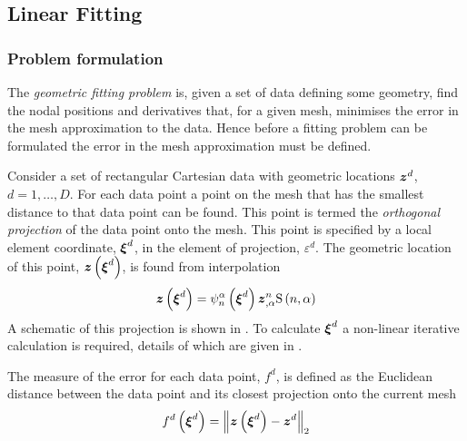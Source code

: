 \subsection{Linear Fitting}

\subsubsection{Problem formulation}

The \emph{geometric fitting problem} is, given a set of data defining some
geometry, find the nodal positions and derivatives that, for a given mesh,
minimises the error in the mesh approximation to the data. Hence before a
fitting problem can be formulated the error in the mesh approximation must be
defined.

Consider a set of rectangular Cartesian data with geometric locations
$\boldsymbol{z}^{d}$, $d=1,\ldots,D$. For each data point a point on the mesh
that has the smallest distance to that data point can be found. This point is
termed the \emph{orthogonal projection} of the data point onto the mesh. This
point is specified by a local element coordinate, $\vect{\xi}^{d}$, in
the element of projection, $\varepsilon^{d}$. The geometric location of
this point, $\fnof{\vectr{z}}{\vect{\xi}^{d}}$, is found from
interpolation \ie
\begin{equation}
  \fnof{\vectr{z}}{\vect{\xi}^{d}}=\gbfn{n}{\alpha}{\vectr{\xi}^{d}}
  \vectr{z}^{n}_{,\alpha}\gsf{n}{\alpha}
  \label{eqn:dataprojectionpos}
\end{equation}
A schematic of this projection is shown in .  To
calculate $\boldsymbol{\xi}^{d}$ a non-linear iterative calculation is
required, details of which are given in .


The measure of the error for each data point, $f^{d}$, is defined as the
Euclidean distance between the data point and its closest projection onto the
current mesh \ie
\begin{equation}
  \fnof{f^{d}}{\vectr{\xi}^{d}}=\norm{\fnof{\vectr{z}}{\vect{\xi}^{d}}-\vect{z}^{d}}
\end{equation}

